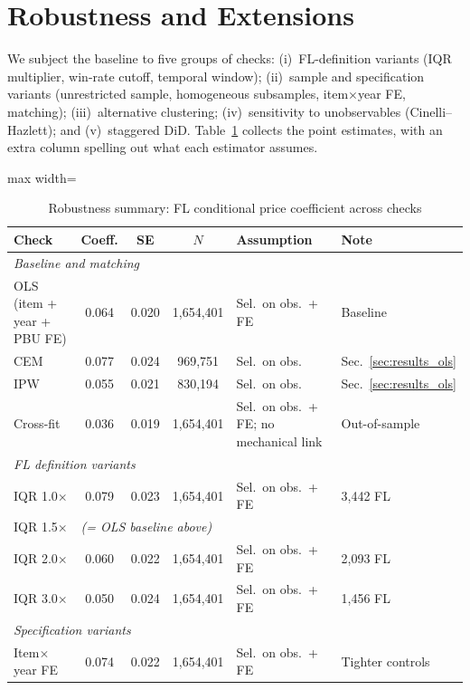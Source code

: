 
\section{Robustness and Extensions}
\label{sec:robustness}


We subject the baseline to five groups of checks:
(i)~FL-definition variants (IQR multiplier, win-rate cutoff, temporal
window); (ii)~sample and specification variants (unrestricted sample,
homogeneous subsamples, item$\times$year FE, matching);
(iii)~alternative clustering; (iv)~sensitivity to unobservables
(Cinelli--Hazlett); and (v)~staggered DiD.
Table~\ref{tab:robustness_summary} collects the point estimates, with
an extra column spelling out what each estimator assumes.


\begin{table}[htbp]
\centering
\caption{Robustness summary: FL conditional price coefficient across checks}
\label{tab:robustness_summary}
\begin{adjustbox}{max width=\textwidth}
\footnotesize
\begin{tabular}{lcccp{3.2cm}l}
\hline\hline
Check & Coeff. & SE & $N$ & Assumption & Note \\
\hline
\multicolumn{6}{l}{\textit{Baseline and matching}} \\
OLS (item + year + PBU FE) & 0.064 & 0.020 & 1{,}654{,}401 & Sel.\ on obs.\ + FE & Baseline \\
CEM & 0.077 & 0.024 & 969{,}751 & Sel.\ on obs. & Sec.~\ref{sec:results_ols} \\
IPW & 0.055 & 0.021 & 830{,}194 & Sel.\ on obs. & Sec.~\ref{sec:results_ols} \\
Cross-fit & 0.036 & 0.019 & 1{,}654{,}401 & Sel.\ on obs.\ + FE; no mechanical link & Out-of-sample \\
\hline
\multicolumn{6}{l}{\textit{FL definition variants}} \\
IQR 1.0$\times$ & 0.079 & 0.023 & 1{,}654{,}401 & Sel.\ on obs.\ + FE & 3{,}442 FL \\
IQR 1.5$\times$ & \multicolumn{5}{l}{\textit{(= OLS baseline above)}} \\
IQR 2.0$\times$ & 0.060 & 0.022 & 1{,}654{,}401 & Sel.\ on obs.\ + FE & 2{,}093 FL \\
IQR 3.0$\times$ & 0.050 & 0.024 & 1{,}654{,}401 & Sel.\ on obs.\ + FE & 1{,}456 FL \\
\hline
\multicolumn{6}{l}{\textit{Specification variants}} \\
Item$\times$year FE & 0.074 & 0.022 & 1{,}654{,}401 & Sel.\ on obs.\ + FE & Tighter controls \\

\end{tabular}
\end{adjustbox}
\end{table}
